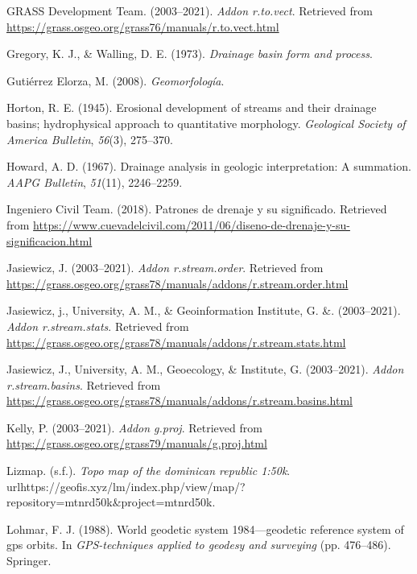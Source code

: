 \documentclass[11pt,]{article}
\begin{document}
\hypertarget{ref-tovect}{}
GRASS Development Team. (2003--2021). \emph{Addon r.to.vect}. Retrieved
from \url{https://grass.osgeo.org/grass76/manuals/r.to.vect.html}

\hypertarget{ref-gregory1973drainage}{}
Gregory, K. J., \& Walling, D. E. (1973). \emph{Drainage basin form and
process}.

\hypertarget{ref-gutierrez2008geomorfologia}{}
Gutiérrez Elorza, M. (2008). \emph{Geomorfología}.

\hypertarget{ref-horton1945erosional}{}
Horton, R. E. (1945). Erosional development of streams and their
drainage basins; hydrophysical approach to quantitative morphology.
\emph{Geological Society of America Bulletin}, \emph{56}(3), 275--370.

\hypertarget{ref-howard1967drainage}{}
Howard, A. D. (1967). Drainage analysis in geologic interpretation: A
summation. \emph{AAPG Bulletin}, \emph{51}(11), 2246--2259.

\hypertarget{ref-patron2018}{}
Ingeniero Civil Team. (2018). Patrones de drenaje y su significado.
Retrieved from
\url{https://www.cuevadelcivil.com/2011/06/diseno-de-drenaje-y-su-significacion.html}

\hypertarget{ref-streamorder}{}
Jasiewicz, J. (2003--2021). \emph{Addon r.stream.order}. Retrieved from
\url{https://grass.osgeo.org/grass78/manuals/addons/r.stream.order.html}

\hypertarget{ref-streamstats}{}
Jasiewicz, j., University, A. M., \& Geoinformation Institute, G. \&.
(2003--2021). \emph{Addon r.stream.stats}. Retrieved from
\url{https://grass.osgeo.org/grass78/manuals/addons/r.stream.stats.html}

\hypertarget{ref-streambasinsjareck}{}
Jasiewicz, J., University, A. M., Geoecology, \& Institute, G.
(2003--2021). \emph{Addon r.stream.basins}. Retrieved from
\url{https://grass.osgeo.org/grass78/manuals/addons/r.stream.basins.html}

\hypertarget{ref-gproj}{}
Kelly, P. (2003--2021). \emph{Addon g.proj}. Retrieved from
\url{https://grass.osgeo.org/grass79/manuals/g.proj.html}

\hypertarget{ref-TopoMap}{}
Lizmap. (s.f.). \emph{Topo map of the dominican republic 1:50k}.
urlhttps://geofis.xyz/lm/index.php/view/map/?repository=mtnrd50k\&project=mtnrd50k.

\hypertarget{ref-lohmar1988world}{}
Lohmar, F. J. (1988). World geodetic system 1984---geodetic reference
system of gps orbits. In \emph{GPS-techniques applied to geodesy and
surveying} (pp. 476--486). Springer.
\end{document}

